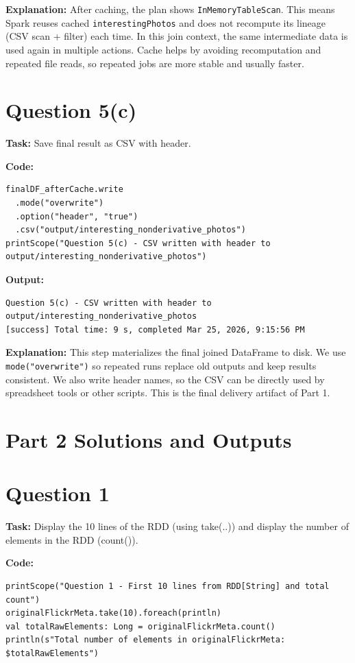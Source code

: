 \documentclass[11pt]{article}
\begin{document}
\textbf{Explanation:} After caching, the plan shows \texttt{InMemoryTableScan}. This means Spark reuses cached \texttt{interestingPhotos} and does not recompute its lineage (CSV scan + filter) each time. In this join context, the same intermediate data is used again in multiple actions. Cache helps by avoiding recomputation and repeated file reads, so repeated jobs are more stable and usually faster.

\section*{Question 5(c)}
\textbf{Task:} Save final result as CSV with header.

\textbf{Code:}
\begin{lstlisting}
finalDF_afterCache.write
  .mode("overwrite")
  .option("header", "true")
  .csv("output/interesting_nonderivative_photos")
printScope("Question 5(c) - CSV written with header to output/interesting_nonderivative_photos")
\end{lstlisting}

\textbf{Output:}
\begin{lstlisting}
Question 5(c) - CSV written with header to output/interesting_nonderivative_photos
[success] Total time: 9 s, completed Mar 25, 2026, 9:15:56 PM
\end{lstlisting}

\textbf{Explanation:} This step materializes the final joined DataFrame to disk. We use \texttt{mode("overwrite")} so repeated runs replace old outputs and keep results consistent. We also write header names, so the CSV can be directly used by spreadsheet tools or other scripts. This is the final delivery artifact of Part 1.

\section*{Part 2 Solutions and Outputs}

\section*{Question 1}
\textbf{Task:} Display the 10 lines of the RDD (using take(..)) and display the number of elements in the RDD (count()).

\textbf{Code:}
\begin{lstlisting}
printScope("Question 1 - First 10 lines from RDD[String] and total count")
originalFlickrMeta.take(10).foreach(println)
val totalRawElements: Long = originalFlickrMeta.count()
println(s"Total number of elements in originalFlickrMeta: $totalRawElements")
\end{lstlisting}
\end{document}

